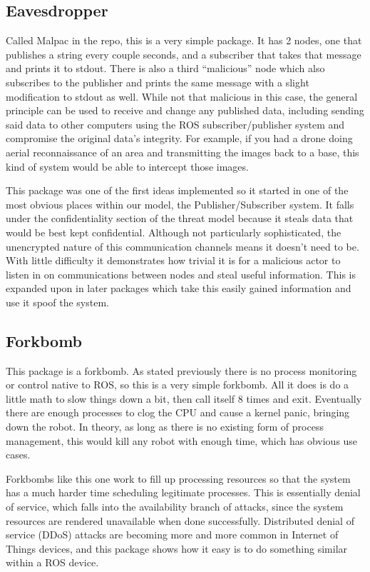 \documentclass[IEEEtran,letterpaper,10pt,notitlepage,draftclsnofoot]{article}
\begin{document}
\subsection{Eavesdropper}
Called Malpac in the repo, this is a very simple package. It has 2 nodes, one that publishes a string every couple seconds, and
a subscriber that takes that message and prints it to stdout. There is also a third “malicious” node which also subscribes to
the publisher and prints the same message with a slight modification to stdout as well. While not that malicious in this case,
the general principle can be used to receive and change any published data, including sending said data to other computers
using the ROS subscriber/publisher system and compromise the original data’s integrity.
For example, if you had a drone doing aerial reconnaissance of an area and transmitting the images back to a base, this kind of
system would be able to intercept those images.

This package was one of the first ideas implemented so it started in one of the most obvious places within our model, the Publisher/Subscriber system.
It falls under the confidentiality section of the threat model because it steals data that would be best kept confidential.
Although not particularly sophisticated, the unencrypted nature of this communication channels means it doesn't need to be.
With little difficulty it demonstrates how trivial it is for a malicious actor to listen in on communications between nodes and steal useful information.
This is expanded upon in later packages which take this easily gained information and use it spoof the system.

\subsection{Forkbomb}
This package is a forkbomb.
As stated previously there is no process monitoring or control native to ROS, so this is a very simple forkbomb. All it does is
do a little math to slow things down a bit, then call itself 8 times and exit.
Eventually there are enough processes to clog the CPU and cause a kernel panic, bringing down the robot.
In theory, as long as there is no existing form of process management, this would kill any robot with enough time, which has
obvious use cases.

Forkbombs like this one work to fill up processing resources so that the system has a much harder time scheduling legitimate processes.
This is essentially denial of service, which falls into the availability branch of attacks, since the system resources are rendered unavailable when done successfully.
Distributed denial of service (DDoS) attacks are becoming more and more common in Internet of Things devices, and this package shows how it easy is to do something similar within a ROS device.
\end{document}
